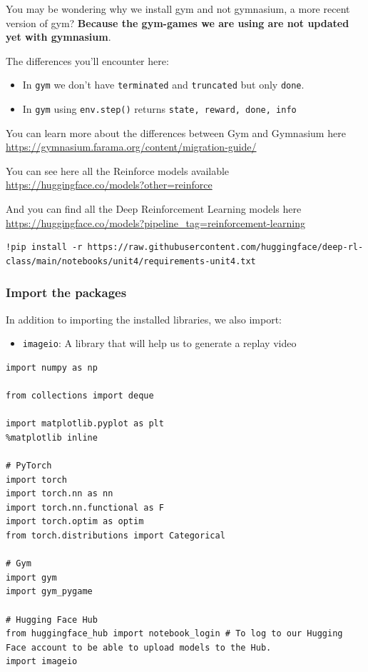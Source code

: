 \documentclass[11pt,a4paper]{article}
\begin{document}
You may be wondering why we install gym and not gymnasium, a more recent version of gym? \textbf{Because the gym-games we are using are not updated yet with gymnasium}.

The differences you'll encounter here:

\begin{itemize}
\tightlist
\item
  In \texttt{gym} we don't have \texttt{terminated} and \texttt{truncated} but only \texttt{done}.
\item
  In \texttt{gym} using \texttt{env.step()} returns \texttt{state,\ reward,\ done,\ info}
\end{itemize}

You can learn more about the differences between Gym and Gymnasium here \url{https://gymnasium.farama.org/content/migration-guide/}

You can see here all the Reinforce models available \url{https://huggingface.co/models?other=reinforce}

And you can find all the Deep Reinforcement Learning models here \url{https://huggingface.co/models?pipeline_tag=reinforcement-learning}

\begin{lstlisting}
!pip install -r https://raw.githubusercontent.com/huggingface/deep-rl-class/main/notebooks/unit4/requirements-unit4.txt
\end{lstlisting}

\subsubsection{Import the packages}\label{import-the-packages}

In addition to importing the installed libraries, we also import:

\begin{itemize}
\tightlist
\item
  \texttt{imageio}: A library that will help us to generate a replay video
\end{itemize}

\begin{lstlisting}
import numpy as np

from collections import deque

import matplotlib.pyplot as plt
%matplotlib inline

# PyTorch
import torch
import torch.nn as nn
import torch.nn.functional as F
import torch.optim as optim
from torch.distributions import Categorical

# Gym
import gym
import gym_pygame

# Hugging Face Hub
from huggingface_hub import notebook_login # To log to our Hugging Face account to be able to upload models to the Hub.
import imageio
\end{lstlisting}
\end{document}
